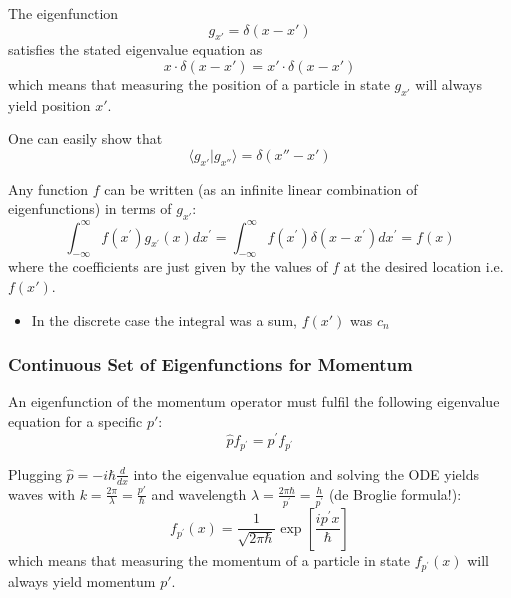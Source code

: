 
The eigenfunction
\begin{equation*}
    g_{x'}=\delta(x-x')
\end{equation*}
satisfies the stated eigenvalue equation as
\begin{equation*}
    x\cdot \delta(x-x')=x'\cdot \delta(x-x')
\end{equation*}
which means that measuring the position of a particle in state $g_{x'}$ will always yield position $x'$.


One can easily show that
\begin{equation*}
    \langle g_{x'}|g_{x''}\rangle=\delta(x''-x')
\end{equation*}


Any function $f$ can be written (as an infinite linear combination of eigenfunctions) in terms of $g_{x'}$:
\begin{equation*}
    \int_{-\infty}^{\infty}f(x^{\prime})g_{x^{\prime}}(x)dx^{\prime}=\int_{-\infty}^{\infty}f(x^{\prime})\delta(x-x^{\prime})dx^{\prime}=f(x)
\end{equation*}
where the coefficients are just given by the values of $f$ at the desired location i.e. $f(x')$.


\begin{itemize}
    \item In the discrete case the integral was a sum, $f(x')$ was $c_n$
\end{itemize}

\subsubsection{Continuous Set of Eigenfunctions for Momentum}


An eigenfunction of the momentum operator must fulfil the following eigenvalue equation for a specific $p'$:
\begin{equation*}
    \hat{p}f_{p^{\prime}}=p^{\prime}f_{p^{\prime}}
\end{equation*}


Plugging $\hat{p}=-i\hbar \frac{d}{dx}$ into the eigenvalue equation and solving the ODE yields waves with $k=\frac{2 \pi}{\lambda}=\frac{p'}{\hbar}$ and wavelength $\lambda=\frac{2\pi\hbar}{p^{\prime}}=\frac{h}{p^{\prime}}$ (de Broglie formula!):
\begin{equation*}
    f_{p^{\prime}}(x)=\frac{1}{\sqrt{2\pi\hbar}}\exp\left[\frac{ip^{\prime}x}{\hbar}\right]
\end{equation*}
which means that measuring the momentum of a particle in state $f_{p^{\prime}}(x)$ will always yield momentum $p'$.

